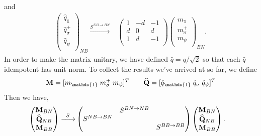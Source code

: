 \documentclass[12pt,a4paper]{article}
\newcounter{arrow}
\newcommand{\unit}{\mathds{1}}
\begin{document}
and
\begin{align}
\left( \begin{matrix}
\hat{q}_\unit\\
\hat{q}_\sigma^+\\
\hat{q}_\psi\\
\end{matrix} \right)_{NB} 
\xrightarrow{S^{NB \rightarrow BN}} & \left( \begin{matrix}
1&-d&-1\\
d&0&d\\
1&d&-1\\
\end{matrix} \right)
\left( \begin{matrix}
m_\unit\\
m_\sigma^+\\
m_\psi\\
\end{matrix} \right)_{BN}.
\end{align}
In order to make the matrix unitary, we have defined $\hat{q} = q/\sqrt{2}$ so that each $\hat{q}$ idempotent has unit norm.
To collect the results we've arrived at so far, we define
\begin{align}
{\bf M} = [ m_\unit \;  m_\sigma^+\;  m_\psi]^T \qquad \widehat{{\bf Q} }= [\hat{q}_\unit \; \hat{q}_\sigma \; \hat{q}_\psi ]^T
\end{align}
Then we have,
\begin{align}
\left( \begin{matrix}
{\bf M}_{BN}\\
\widehat{{\bf Q} }_{NB}\\
{\bf M}_{BB}\\
\end{matrix} \right)
\xrightarrow{\;\; S \; \; } & \left( \begin{matrix}
&S^{BN \rightarrow NB}&\\
S^{NB \rightarrow BN}&&\\
&&S^{BB \rightarrow BB}\\
\end{matrix} \right)
\left( \begin{matrix}
{\bf M}_{BN}\\
\widehat{{\bf Q} }_{NB}\\
{\bf M}_{BB}\\
\end{matrix} \right).
\end{align}
\end{document}
